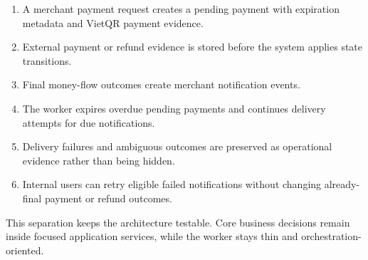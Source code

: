 \begin{enumerate}
  \item A merchant payment request creates a pending payment with expiration
  metadata and VietQR payment evidence.
  \item External payment or refund evidence is stored before the system applies
  state transitions.
  \item Final money-flow outcomes create merchant notification events.
  \item The worker expires overdue pending payments and continues delivery
  attempts for due notifications.
  \item Delivery failures and ambiguous outcomes are preserved as operational
  evidence rather than being hidden.
  \item Internal users can retry eligible failed notifications without
  changing already-final payment or refund outcomes.
\end{enumerate}

This separation keeps the architecture testable. Core business decisions remain
inside focused application services, while the worker stays thin and
orchestration-oriented.
